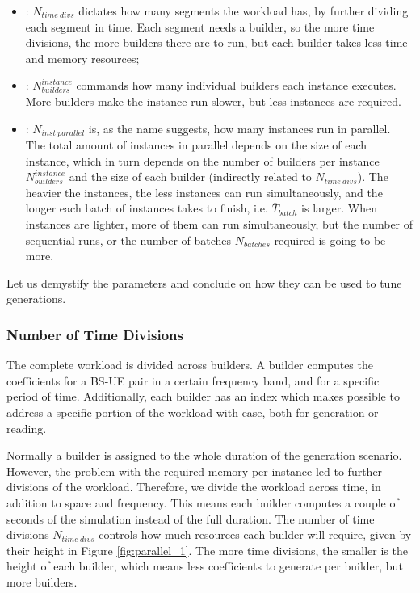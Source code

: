 \begin{itemize}
    \item {}: $N_{time \ divs}$ dictates how many segments the workload has, by further dividing each segment in time. Each segment needs a builder, so the more time divisions, the more builders there are to run, but each builder takes less time and memory resources;
    \item {}: $N_{builders}^{instance}$ commands how many individual builders each instance executes. More builders make the instance run slower, but less instances are required.
    \item {}: $N_{inst \ parallel}$ is, as the name suggests, how many instances run in parallel. The total amount of instances in parallel depends on the size of each instance, which in turn depends on the number of builders per instance $N_{builders}^{instance}$ and the size of each builder (indirectly related to $N_{time \ divs}$). The heavier the instances, the less instances can run simultaneously, and the longer each batch of instances takes to finish, i.e. $\overline{T}_{batch}$ is larger. When instances are lighter, more of them can run simultaneously, but the number of sequential runs, or the number of batches $N_{batches}$ required is going to be more. 
\end{itemize}

Let us demystify the parameters and conclude on how they can be used to tune generations.

\subsubsection*{Number of Time Divisions}
The complete workload is divided across builders. A builder computes the coefficients for a \acs{BS}-\acs{UE} pair in a certain frequency band, and for a specific period of time. Additionally, each builder has an index which makes possible to address a specific portion of the workload with ease, both for generation or reading.

Normally a builder is assigned to the whole duration of the generation scenario. However, the problem with the required memory per instance led to further divisions of the workload. Therefore, we divide the workload across time, in addition to space and frequency. This means each builder computes a couple of seconds of the simulation instead of the full duration. The number of time divisions $N_{time \ divs}$ controls how much resources each builder will require, given by their height in Figure \ref{fig:parallel_1}. The more time divisions, the smaller is the height of each builder, which means less coefficients to generate per builder, but more builders. 

